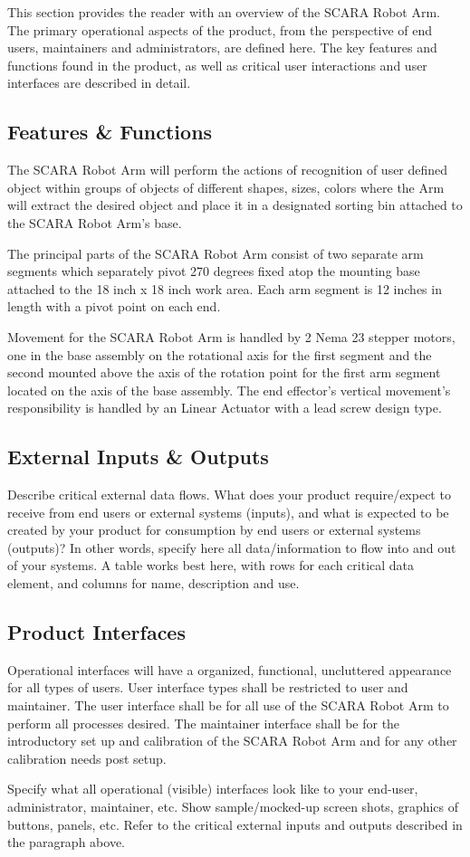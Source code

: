 This section provides the reader with an overview of the SCARA Robot Arm. The primary operational aspects of the product, from the perspective of end users, maintainers and administrators, are defined here. The key features and functions found in the product, as well as critical user interactions and user interfaces are described in detail.

\subsection{Features \& Functions}
The SCARA Robot Arm will perform the actions of recognition of user defined object within groups of objects of different shapes, sizes, colors where the Arm will extract the desired object and place it in a designated sorting bin attached to the SCARA Robot Arm's base.

The principal parts of the SCARA Robot Arm consist of two separate arm segments which separately pivot 270 degrees fixed atop the  mounting base attached to the 18 inch x 18 inch work area. Each arm segment  is 12 inches in length with a pivot point on each end. 

Movement for the SCARA Robot Arm is handled by 2 Nema 23 stepper motors, one in the base assembly on the rotational axis for the first segment and the second mounted above the axis of the rotation point for the first arm segment located on the axis of the base assembly. The end effector's vertical movement's responsibility is handled by an Linear Actuator with a lead screw design type. 

\subsection{External Inputs \& Outputs}

Describe critical external data flows. What does your product require/expect to receive from end users or external systems (inputs), and what is expected to be created by your product for consumption by end users or external systems (outputs)? In other words, specify here all data/information to flow into and out of your systems. A table works best here, with rows for each critical data element, and columns for name, description and use.

\subsection{Product Interfaces}
Operational interfaces will have a organized, functional, uncluttered appearance for all types of users. User interface types shall be restricted to user and maintainer. The user interface shall be for all use of the SCARA Robot Arm to perform all processes desired. The maintainer interface shall be for the introductory set up and calibration of the SCARA Robot Arm and for any other calibration needs post setup. 

Specify what all operational (visible) interfaces look like to your end-user, administrator, maintainer, etc. Show sample/mocked-up screen shots, graphics of buttons, panels, etc. Refer to the critical external inputs and outputs described in the paragraph above.
